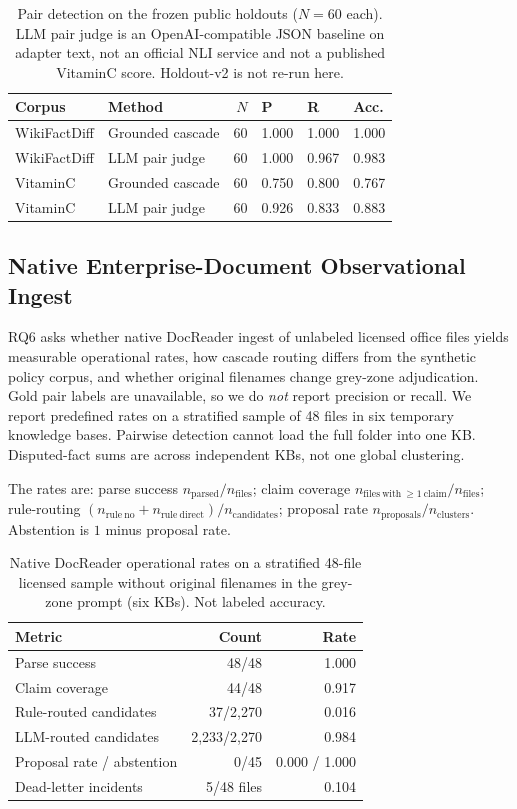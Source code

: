 \documentclass[conference]{IEEEtran}
\begin{document}
\begin{table}[t]
\caption{Pair detection on the frozen public holdouts ($N{=}60$ each). LLM pair judge is an OpenAI-compatible JSON baseline on adapter text, not an official NLI service and not a published VitaminC score. Holdout-v2 is not re-run here.}
\label{tab:public-pair-compare}
\centering
\small
\begin{tabular}{llrlll}
\toprule
Corpus & Method & $N$ & P & R & Acc. \\
\midrule
WikiFactDiff & Grounded cascade & 60 & 1.000 & 1.000 & 1.000 \\
WikiFactDiff & LLM pair judge & 60 & 1.000 & 0.967 & 0.983 \\
VitaminC & Grounded cascade & 60 & 0.750 & 0.800 & 0.767 \\
VitaminC & LLM pair judge & 60 & 0.926 & 0.833 & 0.883 \\
\bottomrule
\end{tabular}
\end{table}

\subsection{Native Enterprise-Document Observational Ingest}
\label{sec:native-obs}

RQ6 asks whether native DocReader ingest of unlabeled licensed office files yields measurable operational rates, how cascade routing differs from the synthetic policy corpus, and whether original filenames change grey-zone adjudication. Gold pair labels are unavailable, so we do \emph{not} report precision or recall. We report predefined rates on a stratified sample of 48 files in six temporary knowledge bases. Pairwise detection cannot load the full folder into one KB. Disputed-fact sums are across independent KBs, not one global clustering.

The rates are: parse success $n_{\mathrm{parsed}}/n_{\mathrm{files}}$; claim coverage $n_{\mathrm{files\ with\ }\ge 1\ \mathrm{claim}}/n_{\mathrm{files}}$; rule-routing $(n_{\mathrm{rule\ no}}+n_{\mathrm{rule\ direct}})/n_{\mathrm{candidates}}$; proposal rate $n_{\mathrm{proposals}}/n_{\mathrm{clusters}}$. Abstention is $1$ minus proposal rate.

\begin{table}[t]
\caption{Native DocReader operational rates on a stratified 48-file licensed sample without original filenames in the grey-zone prompt (six KBs). Not labeled accuracy.}
\label{tab:native-obs}
\centering
\small
\begin{tabular}{lrr}
\toprule
Metric & Count & Rate \\
\midrule
Parse success & 48/48 & 1.000 \\
Claim coverage & 44/48 & 0.917 \\
Rule-routed candidates & 37/2,270 & 0.016 \\
LLM-routed candidates & 2,233/2,270 & 0.984 \\
Proposal rate / abstention & 0/45 & 0.000 / 1.000 \\
Dead-letter incidents & 5/48 files & 0.104 \\
\bottomrule
\end{tabular}
\end{table}
\end{document}
